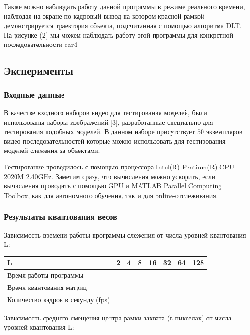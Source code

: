 \documentclass[14pt, a4paper]{article}
\begin{document}
 Также можно наблюдать работу данной программы в режиме реального времени, наблюдая на экране по-кадровый вывод на котором красной рамкой демонстрируется траектория объекта, подсчитанная с помощью алгоритма DLT. На рисунке (2) мы можем наблюдать работу этой программы для конкретной последовательности car4.
 
\subsection{Эксперименты}
\subsubsection{Входные данные}
В качестве входного наборов видео для тестирования моделей, были использованы наборы изображений [3], разработанные специально для тестирования подобных моделей. В данном наборе присутствует $50$ экземпляров видео последовательностей которые можно использовать для тестирования моделей слежения за объектами.

Тестирование проводилось с помощью процессора Intel(R) Pentium(R) CPU 2020M 2.40GHz. Заметим сразу, что вычисления можно ускорить, если вычисления проводить с помощью GPU и MATLAB Parallel Computing Toolbox, как для автономного обучения, так и для online-отслеживания.

\subsubsection{Результаты квантования весов}
Зависимость времени работы программы слежения от числа уровней квантования L:

\begin{table}[h]
\centering
\begin{tabular}{|l|l|l|l|l|l|l|l|}
\hline
L                                 & 2 & 4 & 8 & 16 & 32 & 64 & 128 \\ \hline
Время работы программы            &   &   &   &    &    &    &     \\ \hline
Время квантования матриц          &   &   &   &    &    &    &     \\ \hline
Количество кадров в секунду (fps) &   &   &   &    &    &    &     \\ \hline
\end{tabular}
\end{table}

Зависимость среднего смещения центра рамки захвата (в пикселах) от числа уровней квантования L:
\end{document}
